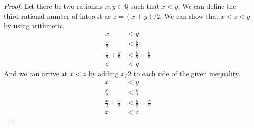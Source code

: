 \documentclass{article}
\newcommand{\Q}{\mathbb{Q}}
\newcommand{\x}{\mathbf{x}}
\newcommand{\z}{\mathbf{z}}
\theoremstyle{definition}
\begin{document}
	\begin{proof}
		Let there be two rationals $ x,y\in\Q $ such that $ x<y $. We can define the third rational number of interest as $ z=(x+y)/2 $. We can show that $ x<z<y $ by using arithmetic.
		\begin{align*}
			x&<y\\\frac{x}{2}&<\frac{y}{2}\\\frac{x}{2}+\frac{y}{2}&<\frac{y}{2}+\frac{y}{2}\\z&<y
		\end{align*} 
		And we can arrive at $ x<z $ by adding $ x/2 $ to each side of the given inequality.
		\begin{align*}
			x&<y\\\frac{x}{2}&<\frac{y}{2}\\\frac{x}{2}+\frac{x}{2}&<\frac{y}{2}+\frac{x}{2}\\x&<z
		\end{align*} 
	\end{proof}
\end{document}
